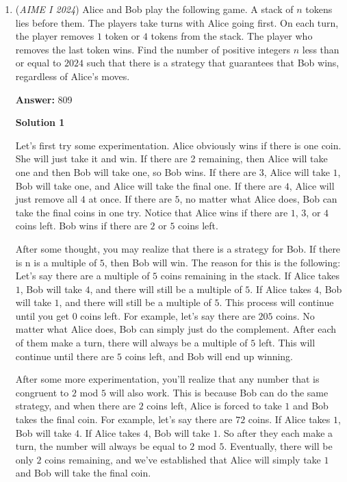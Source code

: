 \begin{enumerate}
	\item (\textit{AIME I 2024}) Alice and Bob play the following game. A stack of $n$ tokens lies before them. The players take turns with Alice going first. On each turn, the player removes $1$ token or $4$ tokens from the stack. The player who removes the last token wins. Find the number of positive integers $n$ less than or equal to $2024$ such that there is a strategy that guarantees that Bob wins, regardless of Alice’s moves.


 
 \textbf{Answer: }809



\textbf{Solution 1}

Let's first try some experimentation. Alice obviously wins if there is one coin. She will just take it and win. If there are 2 remaining, then Alice will take one and then Bob will take one, so Bob wins. If there are $3$, Alice will take $1$, Bob will take one, and Alice will take the final one. If there are $4$, Alice will just remove all $4$ at once. If there are $5$, no matter what Alice does, Bob can take the final coins in one try. Notice that Alice wins if there are $1$, $3$, or $4$ coins left. Bob wins if there are $2$ or $5$ coins left.

 After some thought, you may realize that there is a strategy for Bob. If there is n is a multiple of $5$, then Bob will win. The reason for this is the following: Let's say there are a multiple of $5$ coins remaining in the stack. If Alice takes $1$, Bob will take $4$, and there will still be a multiple of $5$. If Alice takes $4$, Bob will take $1$, and there will still be a multiple of $5$. This process will continue until you get $0$ coins left. For example, let's say there are $205$ coins. No matter what Alice does, Bob can simply just do the complement. After each of them make a turn, there will always be a multiple of $5$ left. This will continue until there are $5$ coins left, and Bob will end up winning.

 After some more experimentation, you'll realize that any number that is congruent to $2$ mod $5$ will also work. This is because Bob can do the same strategy, and when there are $2$ coins left, Alice is forced to take $1$ and Bob takes the final coin. For example, let's say there are $72$ coins. If Alice takes $1$, Bob will take $4$. If Alice takes $4$, Bob will take $1$. So after they each make a turn, the number will always be equal to $2$ mod $5$. Eventually, there will be only $2$ coins remaining, and we've established that Alice will simply take $1$ and Bob will take the final coin.


\end{enumerate}
